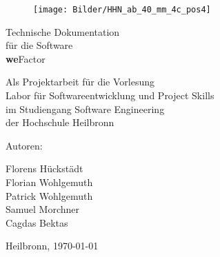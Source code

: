 %
%

\thispagestyle{empty}

\begin{figure}
\flushright						%
\texttt{[image: Bilder/HHN\_ab\_40\_mm\_4c\_pos4]}\\
\end{figure}

\vspace*{1.0cm}

\begin{center}
{\Huge Technische Dokumentation\\
\vspace{0.1cm} 
für die Software\\
\vspace{0.1cm} 
\textbf{we}Factor}

\vspace{3.0cm}

	{\Large Als Projektarbeit für die Vorlesung\\
\vspace{0.1cm}
	Labor für Softwareentwicklung und Project Skills\\
\vspace{0.1cm}
	im Studiengang Software Engineering\\
\vspace{0.1cm}
	der Hochschule Heilbronn\\

}
\end{center}

\vspace*{3.0cm}





Autoren:\\
{\Large
Florens Hückstädt\\
			Florian Wohlgemuth\\
			Patrick Wohlgemuth\\
			Samuel Morchner\\
			Cagdas Bektas

 }
\vspace{1,5cm}
Heilbronn, \today
